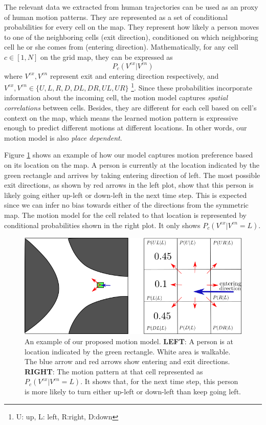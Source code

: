 The relevant data we extracted from human trajectories can be used as an proxy of human motion patterns. They are represented as a set of conditional probabilities for every cell on the map. They represent how likely a person moves to one of the neighboring cells (exit direction), conditioned on which neighboring cell he or she comes from (entering direction). Mathematically, for any cell $c \in [1,N]$ on the grid map, they can be expressed as
\begin{equation}
P_c(V^{ex}|V^{en}) 
\end{equation}
where $V^{ex}, V^{en}$ represent exit and entering direction respectively, and $V^{ex}, V^{en} \in \{U, L, R, D, DL, DR, UL, UR\}$ \footnote{U: up, L: left, R:right, D:down}.
Since these probabilities incorporate information about the incoming cell, the motion model captures \textit{spatial correlations} between cells. Besides, they are different for each cell based on cell’s context on the map, which means the learned motion pattern is expressive enough to predict different motions at different locations. In other words, our motion model is also \textit{place dependent}.

Figure \ref{fig:condi_prob_example} shows an example of how our model captures motion preference based on its location on the map. A person is currently at the location indicated by the green rectangle and arrives by taking entering direction of left. The most possible exit directions, as shown by red arrows in the left plot, show that this person is likely going either up-left or down-left in the next time step. This is expected since we can infer no bias towards either of the directions from the symmetric map. The motion model for the cell related to that location is represented by conditional probabilities shown in the right plot. It only shows $P_c(V^{ex}|V^{en}=L)$.
\begin{figure}[ht]
  \centering
    \includegraphics[width=.85\textwidth]{figures/bofmp_example.png}
    \caption[An example of our proposed motion model.]{An example of our proposed motion model. \textbf{LEFT}: A person is at location indicated by the green rectangle. White area is walkable. The blue arrow and red arrows show entering and exit directions. \textbf{RIGHT}: The motion pattern at that cell represented as $P_c(V^{ex}|V^{en}=L)$. It shows that, for the next time step, this person is more likely to turn either up-left or down-left than keep going left.}
    \label{fig:condi_prob_example}
\end{figure}

